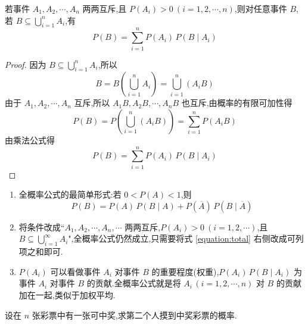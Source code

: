 \begin{theorem}[][全概率公式]
    \indent 若事件 $A_1,A_2,\cdots,A_n$ 两两互斥,且 $P(A_i)>0 \ (i=1,2,\cdots,n)$,则对任意事件 $B$,若 $B \subseteq \displaystyle\bigcup_{i=1}^n A_i$,有
    \begin{equation} \label{equation:total}
        P(B) = \sum_{i=1}^n P(A_i) \, P(B \mid A_i)
    \end{equation}
\end{theorem}

\begin{proof}
    因为 $B \subseteq \displaystyle\bigcup_{i=1}^n A_i$,所以
    $$
    B = B \left( \bigcup_{i=1}^n A_i \right) = \bigcup_{i=1}^n(A_i B)
    $$
    由于 $A_1,A_2,\cdots,A_n$ 互斥,所以 $A_1 B, A_2 B, \cdots, A_n B$ 也互斥,由概率的有限可加性得
    $$
    P(B) = P \left( \bigcup_{i=1}^n (A_i B) \right) = \sum_{i=1}^n P(A_i B)
    $$
    由乘法公式得
    $$
    P(B) = \sum_{i=1}^n P(A_i) \, P(B \mid A_i)
    $$

    \vspace{-2em}
\end{proof}

\begin{note}
    \begin{enumerate}
        \item 全概率公式的最简单形式:若 $0 < P(A) < 1$,则
        $$
        P(B) = P(A) \, P(B \mid A) + P(\overline{A}) \, P(B \mid \overline{A})
        $$
        \item 将条件改成``$A_1, A_2, \cdots, A_n, \cdots$ 两两互斥,$P(A_i)>0 \ (i=1,2,\cdots)$,且 $B \subseteq \displaystyle\bigcup_{i=1}^{\infty} A_i$",全概率公式仍然成立,只需要将式 \eqref{equation:total} 右侧改成可列项之和即可.
        \item $P(A_i)$ 可以看做事件 $A_i$ 对事件 $B$ 的重要程度(权重),$P(A_i) \, P(B \mid A_i)$ 为事件 $A_i$ 对事件 $B$ 的贡献.全概率公式就是将 $A_i \, (i=1,2,\cdots,n)$ 对 $B$ 的贡献加在一起,类似于加权平均.
    \end{enumerate}
\end{note}

\begin{example}
    \indent 设在 $n$ 张彩票中有一张可中奖,求第二个人摸到中奖彩票的概率.
\end{example}

